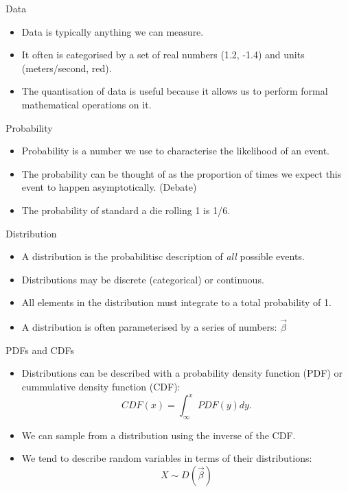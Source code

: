 \documentclass[
  ignorenonframetext,
]{beamer}
\begin{document}
\begin{frame}{Data}
\protect\hypertarget{data}{}
\begin{itemize}
\item
  Data is typically anything we can measure.
\item
  It often is categorised by a set of real numbers (1.2, -1.4) and units
  (meters/second, red).
\item
  The quantisation of data is useful because it allows us to perform
  formal mathematical operations on it.
\end{itemize}
\end{frame}

\begin{frame}{Probability}
\protect\hypertarget{probability}{}
\begin{itemize}
\item
  Probability is a number we use to characterise the likelihood of an
  event.
\item
  The probability can be thought of as the proportion of times we expect
  this event to happen asymptotically. (Debate)
\item
  The probability of standard a die rolling 1 is 1/6.
\end{itemize}
\end{frame}

\begin{frame}{Distribution}
\protect\hypertarget{distribution}{}
\begin{itemize}
\item
  A distribution is the probabilitisc description of \emph{all} possible
  events.
\item
  Distributions may be discrete (categorical) or continuous.
\item
  All elements in the distribution must integrate to a total probability
  of 1.
\item
  A distribution is often parameterised by a series of numbers:
  \(\vec{\beta}\)
\end{itemize}
\end{frame}

\begin{frame}{PDFs and CDFs}
\protect\hypertarget{pdfs-and-cdfs}{}
\begin{itemize}
\item
  Distributions can be described with a probability density function
  (PDF) or cummulative density function (CDF):
  \[CDF(x) = \int_{\infty}^x PDF(y) dy.\]
\item
  We can sample from a distribution using the inverse of the CDF.
\item
  We tend to describe random variables in terms of their distributions:
  \[X \sim D(\vec{\beta}) \]
\end{itemize}
\end{frame}
\end{document}
